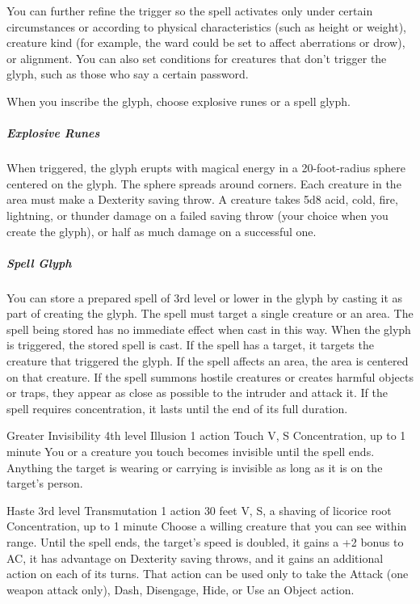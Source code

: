 \documentclass[10pt,a4paper,twoside,bg=print,twocolumn,openany,nodeprecatedcode]{dndbook}
\begin{document}
You can further refine the trigger so the spell activates only under certain circumstances or according to physical characteristics (such as height or weight), creature kind (for example, the ward could be set to affect aberrations or drow), or alignment. You can also set conditions for creatures that don't trigger the glyph, such as those who say a certain password.

When you inscribe the glyph, choose explosive runes or a spell glyph.

\subparagraph{Explosive Runes}
When triggered, the glyph erupts with magical energy in a 20-foot-radius sphere centered on the glyph. The sphere spreads around corners. Each creature in the area must make a Dexterity saving throw. A creature takes 5d8 acid, cold, fire, lightning, or thunder damage on a failed saving throw (your choice when you create the glyph), or half as much damage on a successful one.

\subparagraph{Spell Glyph}
You can store a prepared spell of 3rd level or lower in the glyph by casting it as part of creating the glyph. The spell must target a single creature or an area. The spell being stored has no immediate effect when cast in this way. When the glyph is triggered, the stored spell is cast. If the spell has a target, it targets the creature that triggered the glyph. If the spell affects an area, the area is centered on that creature. If the spell summons hostile creatures or creates harmful objects or traps, they appear as close as possible to the intruder and attack it. If the spell requires concentration, it lasts until the end of its full duration.



\DndSpellHeader%
{Greater Invisibility}
{4th level Illusion}
{1 action}
{Touch}
{V, S}
{Concentration, up to 1 minute}
You or a creature you touch becomes invisible until the spell ends. Anything the target is wearing or carrying is invisible as long as it is on the target's person.



\DndSpellHeader%
{Haste}
{3rd level Transmutation}
{1 action}
{30 feet}
{V, S, a shaving of licorice root}
{Concentration, up to 1 minute}
Choose a willing creature that you can see within range. Until the spell ends, the target's speed is doubled, it gains a +2 bonus to AC, it has advantage on Dexterity saving throws, and it gains an additional action on each of its turns. That action can be used only to take the Attack (one weapon attack only), Dash, Disengage, Hide, or Use an Object action.
\end{document}
